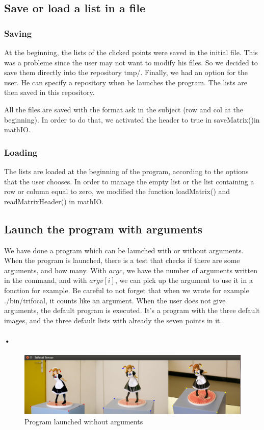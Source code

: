 \documentclass{report}
\begin{document}
\textcolor{subtitle}{\subsection{Save or load a list in a file}}
\subsubsection{Saving}
At the beginning, the lists of the clicked points were saved in the initial file. This was a probleme since the user may not want to modify his files. 
So we decided to save them directly into the repository tmp/.
Finally, we had an option for the user. He can specify a repository when he launches the program. The lists are then saved in this repository. 

All the files are saved with the format ask in the subject (row and col at the beginning). In order to do that, we activated the header to true in saveMatrix()in mathIO. 

\subsubsection{Loading}
The lists are loaded at the beginning of the program, according to the options that the user chooses. In order to manage the empty list or the list containing a row or column equal to zero, we modified the function loadMatrix() and readMatrixHeader() in mathIO. 

\textcolor{subtitle}{\subsection{Launch the program with arguments}}
We have done a program which can be launched with or without arguments. When the program is launched, there is a test that checks if there are some arguments, and how many. With $argc$, we have the number of arguments written in the command, and with $argv[i]$, we can pick up the argument to use it in a fonction for example.
Be careful to not forget that when we wrote for example ./bin/trifocal, it counts like an argument.
When the user does not give arguments, the default program is executed. It's a program with the three default images, and the three default lists with already the seven points in it.
\paragraph{•}
\begin{center}
\begin{figure}[ht]
    \includegraphics[scale=0.4]{defaut.png}
    \caption{Program launched without arguments}
    \label{Picture 1}
\end{figure} 
\end{center}
\end{document}
